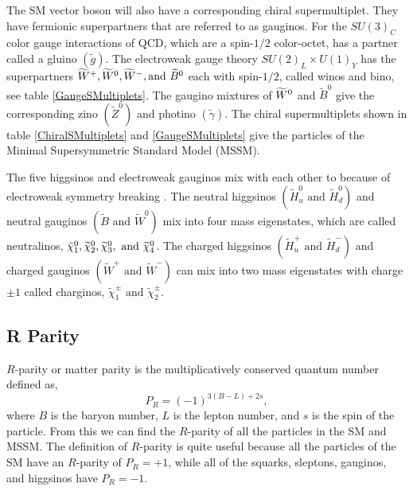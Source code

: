 The SM vector boson will also have a corresponding chiral supermultiplet. They have fermionic superpartners that are referred to as gauginos. For the $SU(3)_C$ color gauge interactions of QCD, which are a spin-$1/2$ color-octet, has a partner called a gluino $(\widetilde{g})$. The electroweak gauge theory $SU(2)_L\times U(1)_Y$ has the superpartners $\widetilde{W}^+,\widetilde{W}^0, \widetilde{W}^-, \text{and } \widetilde{B}^0$ each with spin-$1/2$, called winos and bino, see table \ref{GaugeSMultiplets}. The gaugino mixtures of $\widetilde{W}^0$ and $\widetilde{B}^0$ give the corresponding zino $(\widetilde{Z}^0)$ and photino $(\widetilde{\gamma})$. The chiral supermultiplets shown in table \ref{ChiralSMultiplets} and \ref{GaugeSMultiplets} give the particles of the Minimal Supersymmetric Standard Model (MSSM). 

The five higgsinos and electroweak gauginos mix with each other to because of electroweak symmetry breaking \cite{martin_supersymmetry_1997}. The neutral higgsinos $(\widetilde{H}_u^0 \text{ and } \widetilde{H}_d^0)$ and neutral gauginos $(\widetilde{B} \text{ and } \widetilde{W}^0)$ mix into four mass eigenstates, which are called neutralinos, $\tilde{\chi}^{0}_{1}, \widetilde{\chi}^0_2, \widetilde{\chi}^0_3, \text{ and }\widetilde{\chi}^0_4$. The charged higgsinos $(\widetilde{H}_u^+ \text{ and } \widetilde{H}_d^-)$ and charged gauginos $(\widetilde{W}^+\text{ and } \widetilde{W}^-)$ can mix into two mass eigenstates with charge $\pm1$ called charginos,  $\widetilde{\chi}^\pm_1 \text{ and } \widetilde{\chi}^\pm_2$. 

\subsection{R Parity}
\label{subsec:rparity}

$R$-parity or matter parity is the multiplicatively conserved quantum number defined as, 
\begin{equation} \label{RParity}
P_R=(-1)^{3(B-L)+2s}, 
\end{equation}
where $B$ is the baryon number, $L$ is the lepton number, and $s$ is the spin of the particle. From this we can find the $R$-parity of all the particles in the SM and MSSM. The definition of $R$-parity is quite useful because all the particles of the SM have an $R$-parity of $P_R=+1$, while all of the squarks, sleptons, gauginos, and higgsinos have $P_R=-1$.

